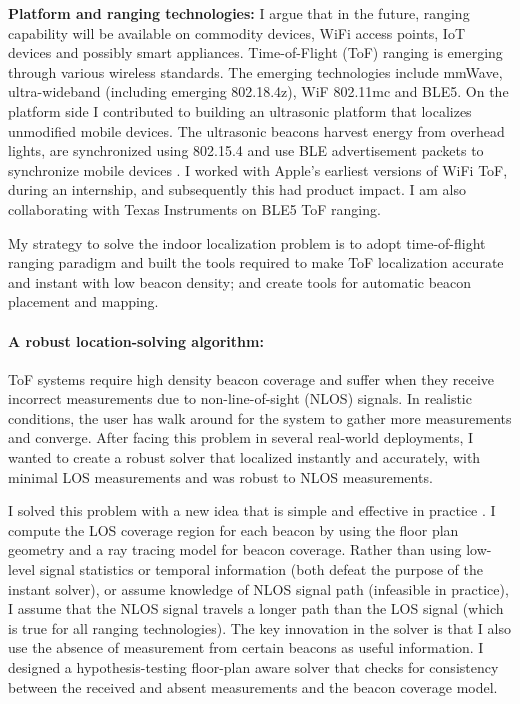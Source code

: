 \documentclass[10pt]{article}
\begin{document}

\textbf{Platform and ranging technologies:} I argue that in the future, ranging capability will be available on commodity devices, WiFi access points, IoT devices and possibly smart appliances. %
Time-of-Flight (ToF) ranging is emerging through various wireless standards. %
The emerging technologies include mmWave, ultra-wideband (including emerging 802.18.4z), WiF 802.11mc and BLE5. On the platform side I contributed to building an ultrasonic platform that localizes unmodified mobile devices. The ultrasonic beacons harvest energy from overhead lights, are synchronized using 802.15.4 and use BLE advertisement packets to synchronize mobile devices
\cite{rtas-alps-platform, lazik2015alps,lazik2015alpsdemo}. I worked with Apple's earliest versions of WiFi ToF, during an internship, and subsequently this had product impact. I am also collaborating with Texas Instruments on BLE5 ToF ranging. 

My strategy to solve the indoor localization problem is to adopt time-of-flight ranging paradigm and built the tools required to make ToF localization accurate and instant with low beacon density; and create tools for automatic beacon placement and mapping. 

\paragraph{A robust location-solving algorithm: }
ToF systems require high density beacon coverage and suffer when they receive incorrect measurements due to
non-line-of-sight (NLOS) signals. 
In realistic conditions, the user has walk around for the system to gather more measurements and converge. After facing this problem in several real-world deployments, I wanted to create a robust solver that localized instantly and accurately, with minimal LOS measurements and was robust to NLOS measurements. 

I solved this problem with a new idea that is simple and effective in practice \cite{rajagopal2018enhancing}. 
I compute the LOS coverage region for each beacon by using the floor plan geometry and a ray tracing model for beacon coverage. Rather than using low-level signal statistics or temporal information (both defeat the purpose of the instant solver), or assume knowledge of NLOS signal path (infeasible in practice), I assume that the NLOS signal travels a longer path than the LOS signal (which is true for all ranging technologies). The key innovation in the solver is that I also use the absence of measurement from certain beacons as useful information. I designed a hypothesis-testing floor-plan aware solver that checks for consistency between the received and absent measurements and the beacon coverage model.
\end{document}
